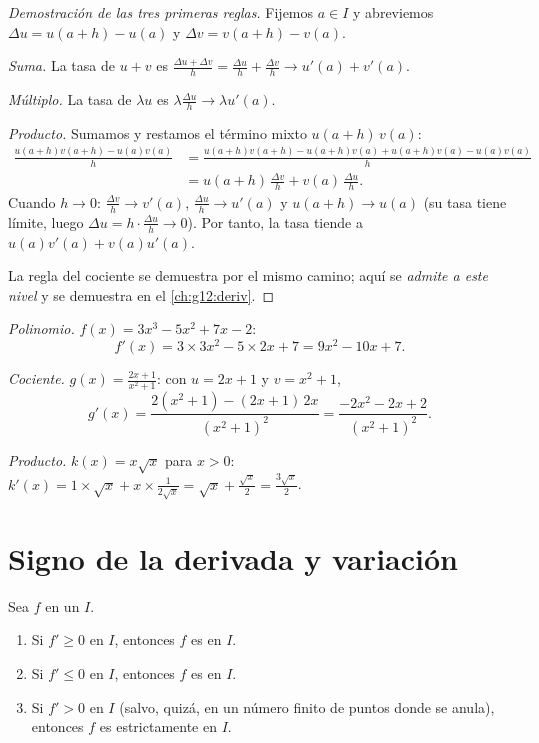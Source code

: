 \begin{proof}[Demostración de las tres primeras reglas]
Fijemos $a \in I$ y abreviemos $\Delta u = u(a+h) - u(a)$ y
$\Delta v = v(a+h) - v(a)$.

\emph{Suma.} La tasa de $u + v$ es
$\frac{\Delta u + \Delta v}{h} = \frac{\Delta u}{h} + \frac{\Delta v}{h}
\to u'(a) + v'(a)$.

\emph{Múltiplo.} La tasa de $\lambda u$ es
$\lambda \frac{\Delta u}{h} \to \lambda u'(a)$.

\emph{Producto.} Sumamos y restamos el término mixto $u(a+h)\,v(a)$:
\begin{align*}
\frac{u(a+h)v(a+h) - u(a)v(a)}{h}
&= \frac{u(a+h)v(a+h) - u(a+h)v(a) + u(a+h)v(a) - u(a)v(a)}{h}\\
&= u(a+h)\,\frac{\Delta v}{h} + v(a)\,\frac{\Delta u}{h}.
\end{align*}
Cuando $h \to 0$: $\frac{\Delta v}{h} \to v'(a)$,
$\frac{\Delta u}{h} \to u'(a)$ y $u(a+h) \to u(a)$ (su tasa tiene límite,
luego $\Delta u = h \cdot \frac{\Delta u}{h} \to 0$). Por tanto, la tasa
tiende a $u(a)v'(a) + v(a)u'(a)$.

La regla del cociente se demuestra por el mismo camino; aquí se
\emph{admite a este nivel} y se demuestra en el \cref{ch:g12:deriv}.
\end{proof}

\begin{example}\label{ex:g11:deriv:computations}
\emph{Polinomio.} $f(x) = 3x^3 - 5x^2 + 7x - 2$:
\[
f'(x) = 3 \times 3x^2 - 5 \times 2x + 7 = 9x^2 - 10x + 7 .
\]

\emph{Cociente.} $g(x) = \frac{2x+1}{x^2+1}$: con $u = 2x + 1$ y
$v = x^2 + 1$,
\[
g'(x) = \frac{2(x^2+1) - (2x+1)\,2x}{(x^2+1)^2}
= \frac{-2x^2 - 2x + 2}{(x^2+1)^2}.
\]

\emph{Producto.} $k(x) = x\sqrt x$ para $x > 0$:
$k'(x) = 1 \times \sqrt x + x \times \frac{1}{2\sqrt x}
= \sqrt x + \frac{\sqrt x}{2} = \frac{3\sqrt x}{2}$.
\end{example}

\section{Signo de la derivada y variación}

\begin{theorem}\label{thm:g11:deriv:variations}
Sea $f$  en un  $I$.
\begin{enumerate}
  \item Si $f' \geq 0$ en $I$, entonces $f$ es  en $I$.
  \item Si $f' \leq 0$ en $I$, entonces $f$ es  en $I$.
  \item Si $f' > 0$ en $I$ (salvo, quizá, en un número finito de puntos
        donde se anula), entonces $f$ es estrictamente  en $I$.
\end{enumerate}
\end{theorem}

